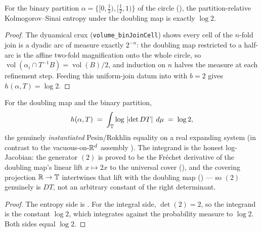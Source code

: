 \begin{theorem}[Rokhlin equality, entropy side: \(h(\alpha,T) = \log 2\)]\label{ksEntropyPartition_doublingMap_eq_log_two}
  \leanok
  For the binary partition \(\alpha = \{[0,\tfrac12), [\tfrac12,1)\}\) of the circle
  (), the partition-relative Kolmogorov--Sinai
  entropy under the doubling map is exactly \(\log 2\).
\end{theorem}
\begin{proof}\leanok
  The dynamical crux (\texttt{volume\_binJoinCell}) shows every cell
  of the \(n\)-fold join is a dyadic arc of measure exactly \(2^{-n}\): the doubling map restricted
  to a half-arc is the affine two-fold magnification onto the whole circle, so
  \(\operatorname{vol}(\alpha_i\cap T^{-1}B) = \operatorname{vol}(B)/2\), and induction on \(n\)
  halves the measure at each refinement step. Feeding this uniform-join datum into
   with \(b = 2\) gives \(h(\alpha,T) = \log 2\).
\end{proof}

\begin{theorem}\label{rokhlin_equality_doublingMap}
  \leanok
  For the doubling map and the binary partition,
  \[
    h(\alpha, T) \;=\; \int_{\mathbb{T}} \log\,\left\lvert \det DT \right\rvert\;d\mu \;=\; \log 2 ,
  \]
  the genuinely \emph{instantiated} Pesin/Rokhlin equality on a real expanding system (in contrast
  to the vacuous-on-\(\mathbb{R}^d\) assembly ). The integrand is the honest
  log-Jacobian: the generator \((2)\) is proved to be the Fr\'echet derivative of the doubling
  map's linear lift \(x\mapsto 2x\) to the universal cover
  (), and the covering
  projection \(\mathbb{R}\to\mathbb{T}\) intertwines that lift with the doubling map
  () --- so \((2)\) genuinely is
  \(DT\), not an arbitrary constant of the right determinant.
\end{theorem}
\begin{proof}\leanok
  The entropy side is . For the integral side,
  \(\det(2) = 2\), so the integrand is the constant \(\log 2\), which integrates against the
  probability measure to \(\log 2\). Both sides equal \(\log 2\).
\end{proof}

